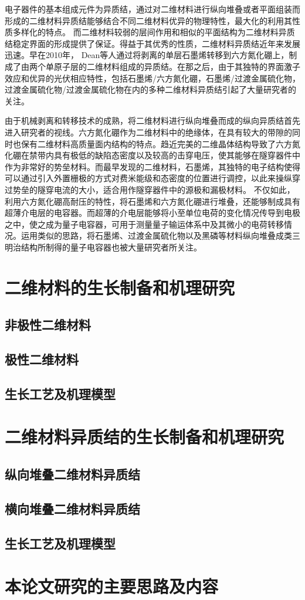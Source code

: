 电子器件的基本组成元件为异质结，通过对二维材料进行纵向堆叠或者平面组装而形成的二维材料异质结能够结合不同二维材料优异的物理特性，最大化的利用其性质多样化的特点。 而二维材料较弱的层间作用和相似的平面结构为二维材料异质结稳定界面的形成提供了保证。得益于其优秀的性质，二维材料异质结近年来发展迅速。早在2010年， Dean等人通过将剥离的单层石墨烯转移到六方氮化硼上，制成了由两个单原子层的二维材料组成的异质结。在那之后，由于其独特的界面激子效应和优异的光伏相应特性，包括石墨烯/六方氮化硼，石墨烯/过渡金属硫化物，过渡金属硫化物/过渡金属硫化物在内的多种二维材料异质结引起了大量研究者的关注。

由于机械剥离和转移技术的成熟，将二维材料进行纵向堆叠而成的纵向异质结首先进入研究者的视线。六方氮化硼作为二维材料中的绝缘体，在具有较大的带隙的同时也保有二维材料高质量面内结构的特点。趋近完美的二维晶体结构导致了六方氮化硼在禁带内具有极低的缺陷态密度以及较高的击穿电压，使其能够在隧穿器件中作为非常好的势垒材料。而最早发现的二维材料，石墨烯，其独特的电子结构使得可以通过引入外置栅极的方式对费米能级和态密度的位置进行调控，以此来操纵穿过势垒的隧穿电流的大小，适合用作隧穿器件中的源极和漏极材料。
不仅如此，利用六方氮化硼高耐压的特性，将石墨烯和六方氮化硼进行堆叠，还能够制成具有超薄介电层的电容器。而超薄的介电层能够将小至单位电荷的变化情况传导到电极之中，使之成为量子电容器，可用于测量量子输运体系中及其微小的电荷转移情况。运用类似的思路，将石墨烯、过渡金属硫化物以及黑磷等材料纵向堆叠成类三明治结构所制得的量子电容器也被大量研究者所关注。



\section{二维材料的生长制备和机理研究}
\subsection{非极性二维材料}
\subsection{极性二维材料}
\subsection{生长工艺及机理模型}

\section{二维材料异质结的生长制备和机理研究}
\subsection{纵向堆叠二维材料异质结}
\subsection{横向堆叠二维材料异质结}
\subsection{生长工艺及机理模型}

\section{本论文研究的主要思路及内容}